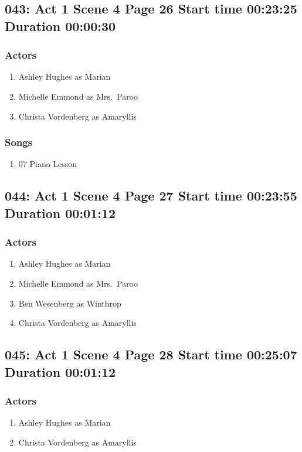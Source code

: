 \subsection{043: Act 1 Scene 4 Page 26 Start time 00:23:25 Duration 00:00:30}

\subsubsection{Actors}
\begin{enumerate}
\item Ashley Hughes as Marian
\item Michelle Emmond as Mrs.~Paroo
\item Christa Vordenberg as Amaryllis
\end{enumerate}

\subsubsection{Songs}
\begin{enumerate}
\item 07 Piano Lesson
\end{enumerate}
\subsection{044: Act 1 Scene 4 Page 27 Start time 00:23:55 Duration 00:01:12}

\subsubsection{Actors}
\begin{enumerate}
\item Ashley Hughes as Marian
\item Michelle Emmond as Mrs.~Paroo
\item Ben Wesenberg as Winthrop
\item Christa Vordenberg as Amaryllis
\end{enumerate}


\subsection{045: Act 1 Scene 4 Page 28 Start time 00:25:07 Duration 00:01:12}

\subsubsection{Actors}
\begin{enumerate}
\item Ashley Hughes as Marian
\item Christa Vordenberg as Amaryllis
\end{enumerate}


